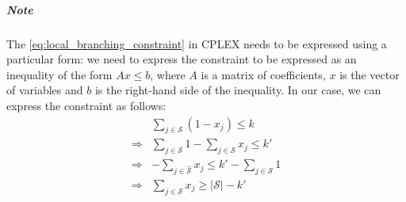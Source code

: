\documentclass{article}
\begin{document}
\subparagraph{Note}
The \ref{eq:local_branching_constraint} in CPLEX needs to be expressed using a particular form: we need to express the constraint
to be expressed as an inequality of the form $Ax \leq b$, where $A$ is a matrix of coefficients, $x$ is the vector of variables and $b$ is the right-hand side of the inequality.
In our case, we can express the constraint as follows:
\begin{align}
	& \sum_{j \in \mathcal{S}} (1 - x_j) \leq k \\
	\Rightarrow & \sum_{j \in \mathcal{S}}1 -\sum_{j \in \mathcal{S}} x_j \leq k' \\
	\Rightarrow & -\sum_{j \in \hat{\mathcal{S}}} x_j \leq k' - \sum_{j \in \mathcal{S}}1 \\
	\Rightarrow & \sum_{j \in \mathcal{S}} x_j \geq |\mathcal{S}| - k'
\end{align}
\newpage



\end{document}
